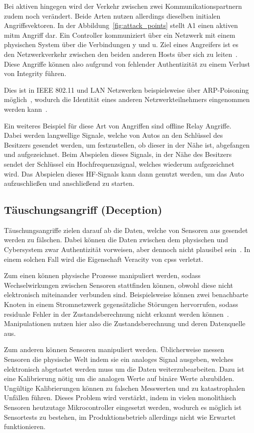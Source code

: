 \documentclass[final,bibliography=totocnumbered]{include/sikseminar}
\newcommand{\cps}{\glspl{cps}\xspace}
\begin{document}
Bei aktiven hingegen wird der Verkehr zwischen zwei Kommunikationspartnern zudem noch verändert.
Beide Arten nutzen allerdings dieselben initialen Angriffsvektoren.
In der Abbildung~\ref{fig:attack_points} stellt A1 einen aktiven \gls{mitm} Angriff dar.
Ein Controller kommuniziert über ein Netzwerk mit einem physischen System über die Verbindungen y und u.
Ziel eines Angreifers ist es den Netzwerkverkehr zwischen den beiden anderen Hosts über sich zu leiten~\cite{WYX+10,FPA+18}.
Diese Angriffe können also aufgrund von fehlender Authentizität zu einem Verlust von Integrity führen.

Dies ist in IEEE 802.11 und LAN Netzwerken beispielsweise über ARP-Poisoning möglich~\cite{FIT+12}, wodurch die Identität eines anderen Netzwerkteilnehmers eingenommen werden kann~\cite{RN05}.

Ein weiteres Beispiel für diese Art von Angriffen sind offline Relay Angriffe.
Dabei werden langwellige Signale, welche von Autos an den Schlüssel des Besitzers gesendet werden, um festzustellen, ob dieser in der Nähe ist, abgefangen und aufgezeichnet.
Beim Abspielen dieses Signals, in der Nähe des Besitzers sendet der Schlüssel ein Hochfrequenzsignal, welches wiederum aufgezeichnet wird.
Das Abspielen dieses HF-Signals kann dann genutzt werden, um das Auto aufzuschließen und anschließend zu starten.~\cite{HLL+17}

\subsection{Täuschungsangriff (Deception)}\label{subsec:tauschung} %
Täuschungsangriffe zielen darauf ab die Daten, welche von Sensoren aus gesendet werden zu fälschen.
Dabei können die Daten zwischen dem physischen und Cybersystem zwar Authentizität vorweisen, aber dennoch nicht plausibel sein~\cite{SFJ17}.
In einem solchen Fall wird die Eigenschaft Veracity von \cps verletzt.

Zum einen können physische Prozesse manipuliert werden, sodass Wechselwirkungen zwischen Sensoren stattfinden können, obwohl diese nicht elektronisch miteinander verbunden sind.
Beispielsweise können zwei benachbarte Knoten in einem Stromnetzwerk gegensätzliche Störungen hervorrufen, sodass residuale Fehler in der Zustandsberechnung nicht erkannt werden können~\cite{KLG15}.
Manipulationen nutzen hier also die Zustandsberechnung und deren Datenquelle aus.

Zum anderen können Sensoren manipuliert werden.
Üblicherweise messen Sensoren die physische Welt indem sie ein analoges Signal ausgeben, welches elektronisch abgetastet werden muss um die Daten weiterzubearbeiten.
Dazu ist eine Kalibrierung nötig um die analogen Werte auf binäre Werte abzubilden.
Ungültige Kalibrierungen können zu falschen Messwerten und zu katastrophalen Unfällen führen.
Dieses Problem wird verstärkt, indem in vielen monolithisch Sensoren heutzutage Mikrocontroller eingesetzt werden, wodurch es möglich ist Sensortests zu bestehen, im Produktionsbetrieb allerdings nicht wie Erwartet funktionieren.~\cite{KLG15}
\end{document}

